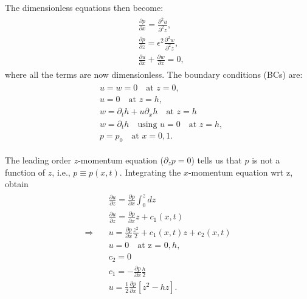 \documentclass{article}
\begin{document}
The dimensionless equations then become:
\begin{align}\label{eq:thin_film_dimless}
 \begin{split}
  & \frac{\partial p}{\partial x} =\frac{\partial^{2}u}{\partial^{2}z},\\
  & \frac{\partial p}{\partial z} = \epsilon^{2}\frac{\partial^{2}w}{\partial^{2}z},\\
  & \frac{\partial u}{\partial x} + \frac{\partial w}{\partial z} = 0,
 \end{split}
\end{align}
where all the terms are now dimensionless.
The boundary conditions (BCs) are:
\begin{align}\label{eq:thin_film_bcs_dimless}
 \begin{split}
  &u = w = 0 \quad \textrm{at } z = 0, \\
  &u = 0 \quad \textrm{at }z = h, \\
  & w = \partial_{t} h + u \partial_{x}h \quad \textrm{at }z = h\\
  & w = \partial_{t}h  \quad \textrm{using }u = 0 \quad \textrm{at } z = h,\\
  & p = p_{0} \quad \textrm{at }x = 0, 1.
 \end{split}
\end{align}

The leading order $z$-momentum equation ($\partial_{z}p = 0$) tells us that $p$ is not a function of $z$, i.e., $p \equiv p(x, t)$. Integrating the $x$-momentum equation wrt z, obtain 
\begin{align}\label{eq:thin_film_u}
 \begin{split}
  & \frac{\partial u}{\partial z} = \frac{\partial p}{\partial x} \int_{0}^{z} dz \\
  & \frac{\partial u}{\partial z} = \frac{\partial p}{\partial x} z + c_{1}(x, t)\\
  \Rightarrow \quad & u = \frac{\partial p}{\partial x} \frac{z^{2}}{2} + c_{1}(x, t) z + c_{2}(x, t)\\
  & u = 0 \quad \textrm{at z = }0, h, \\
  & c_{2} = 0 \\
  & c_{1} = - \frac{\partial p}{\partial x} \frac{h}{2}\\
  & \boxed{u = \frac{1}{2}\frac{\partial p}{\partial x}\left[z^{2}-hz \right]}.
 \end{split}
\end{align}
\end{document}
